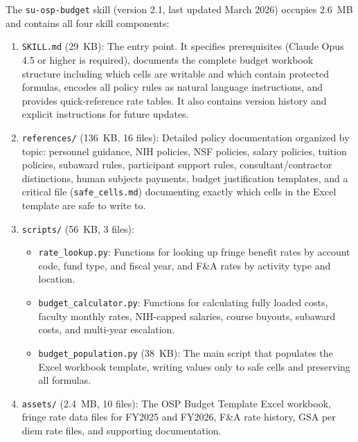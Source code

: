 \documentclass[12pt]{article}
\begin{document}
The \texttt{su-osp-budget} skill (version 2.1, last updated March 2026) occupies 2.6~MB and contains all four skill components:
\begin{enumerate}
\item \texttt{SKILL.md} (29~KB): The entry point. It specifies prerequisites (Claude Opus 4.5 or higher is required), documents the complete budget workbook structure including which cells are writable and which contain protected formulas, encodes all policy rules as natural language instructions, and provides quick-reference rate tables. It also contains version history and explicit instructions for future updates.

\item \texttt{references/} (136~KB, 16 files): Detailed policy documentation organized by topic: personnel guidance, NIH policies, NSF policies, salary policies, tuition policies, subaward rules, participant support rules, consultant/contractor distinctions, human subjects payments, budget justification templates, and a critical file (\texttt{safe\_cells.md}) documenting exactly which cells in the Excel template are safe to write to.

\item \texttt{scripts/} (56~KB, 3 files):
  \begin{itemize}
  \item \texttt{rate\_lookup.py}: Functions for looking up fringe benefit rates by account code, fund type, and fiscal year, and F\&A rates by activity type and location.
  \item \texttt{budget\_calculator.py}: Functions for calculating fully loaded costs, faculty monthly rates, NIH-capped salaries, course buyouts, subaward costs, and multi-year escalation.
  \item \texttt{budget\_population.py} (38~KB): The main script that populates the Excel workbook template, writing values only to safe cells and preserving all formulas.
  \end{itemize}

\item \texttt{assets/} (2.4~MB, 10 files): The OSP Budget Template Excel workbook, fringe rate data files for FY2025 and FY2026, F\&A rate history, GSA per diem rate files, and supporting documentation.
\end{enumerate}
\end{document}
